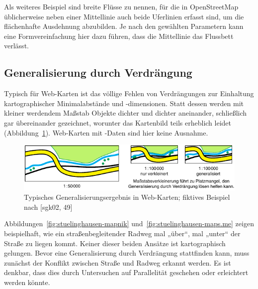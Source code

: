 \documentclass[../main/thesis.tex]{subfiles}
\begin{document}
Als weiteres Beispiel sind breite Flüsse zu nennen, für die in OpenStreetMap üblicherweise neben einer Mittellinie auch beide Uferlinien erfasst sind, um die flächenhafte Ausdehnung abzubilden.
Je nach den gewählten Parametern kann eine Formvereinfachung hier dazu führen, dass die Mittellinie das Flussbett verlässt. 



\subsection{Generalisierung durch Verdrängung}

Typisch für Web-Karten ist das völlige Fehlen von Verdrängungen zur Einhaltung kartographischer Minimalabstände und -dimensionen.
Statt dessen werden mit kleiner werdendem Maßstab Objekte dichter und dichter aneinander, schließlich gar übereinander gezeichnet, worunter das Kartenbild teils erheblich leidet (Abbildung~\ref{fig:verdraengung}).
Web-Karten mit \osm-Daten sind hier keine Ausnahme.

\begin{figure}[ht]
    \centering
    \includegraphics[width=\ScaleIfNeeded]{../chapter2/verdraengung}
    \caption{Typisches Generalisierungsergebnis in Web-Karten; fiktives Beispiel nach [sgk02, 49]}\label{fig:verdraengung}
\end{figure}

Abbildungen~\ref{fig:stuelinghausen-mapnik} und~\ref{fig:stuelinghausen-maps.me} zeigen beispielhaft, wie ein straßenbegleitender Radweg mal „über“, mal „unter“ der Straße zu liegen kommt.
Keiner dieser beiden Ansätze ist kartographisch gelungen.
Bevor eine Generalisierung durch Verdrängung stattfinden kann, muss zunächst der Konflikt zwischen Straße und Radweg erkannt werden.
Es ist denkbar, dass dies durch Untersuchen auf Parallelität geschehen oder erleichtert werden könnte.
\end{document}

